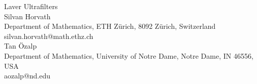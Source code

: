 \documentclass[12pt]{article}
\theoremstyle{definition}
\begin{document}
\begin{center}
{\Large\sc Laver Ultrafilters}\\[1.8ex]


{\small Silvan Horvath}\\[1.2ex] 
{\scriptsize Department of Mathematics, ETH Z\"urich, 
8092 Z\"urich, Switzerland\\ 
silvan.horvath@math.ethz.ch}\\[1.8ex]

{\small Tan {\"O}zalp}\\[1.2ex] 
{\scriptsize Department of Mathematics, University of Notre Dame,
Notre Dame, IN 46556, USA\\
aozalp@nd.edu}\\[1.8ex]

\end{center}

\end{document}

